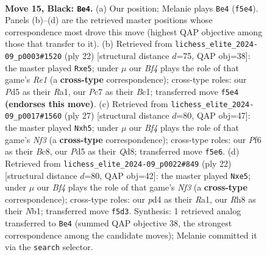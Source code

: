 \documentclass[11pt]{article}
\begin{document}
\clearpage

\begin{figure}[p]\centering
\begin{subfigure}{0.46\textwidth}\centering
\resizebox{\linewidth}{!}{%
\newchessgame
\chessboard[
  setfen={r2qk2r/ppp1b3/nn3pp1/1N1p1b1p/P2P4/1B5N/RPP2PPP/2BQR1K1 b kq - 7 15},
  showmover=false,
  pgfstyle=straightmove, color=movearrow, markmove={f5-e4}
]}
\caption{}
\end{subfigure}\hfill
\begin{subfigure}{0.46\textwidth}\centering
\resizebox{\linewidth}{!}{%
\newchessgame
\chessboard[
  setfen={r1bq1rk1/4ppbp/pp3np1/2p1n3/P1B5/2NP3P/1PP2PP1/R1BQR1K1 w - - 0 12},
  showmover=false,
  pgfstyle=straightmove, color=movearrow, markmove={e1-e5}
]}
\caption{}
\end{subfigure}
\\[4pt]
\begin{subfigure}{0.46\textwidth}\centering
\resizebox{\linewidth}{!}{%
\newchessgame
\chessboard[
  setfen={r1bqr1k1/1p2bppp/2pp1n2/p6N/Pn2P3/1BN4P/1PP2PP1/R1BQ1RK1 b - - 2 14},
  showmover=false,
  pgfstyle=straightmove, color=movearrow, markmove={f6-h5}
]}
\caption{}
\end{subfigure}\hfill
\begin{subfigure}{0.46\textwidth}\centering
\resizebox{\linewidth}{!}{%
\newchessgame
\chessboard[
  setfen={r1bqr1k1/2p2ppp/pb1p1n2/1p2n3/4P3/1BP2N1P/PP3PP1/RNBQR1K1 w - - 0 12},
  showmover=false,
  pgfstyle=straightmove, color=movearrow, markmove={f3-e5}
]}
\caption{}
\end{subfigure}
\caption{\textbf{Move 15, Black: \texttt{Be4}.} (a) Our position; Melanie plays \texttt{Be4} (\texttt{f5e4}). Panels (b)--(d) are the retrieved master positions whose correspondence most drove this move (highest QAP objective among those that transfer to it). (b) Retrieved from \texttt{lichess\_elite\_2024-09\_p0003\#1520} (ply 22) [structural distance $d$=75, QAP obj=38]: the master played \texttt{Rxe5}; under $\mu$ our \emph{Bf4} plays the role of that game's \emph{Re1} (a \textbf{cross-type} correspondence); cross-type roles: our \emph{P}d5 as their \emph{R}a1, our \emph{P}c7 as their \emph{B}c1; transferred move \texttt{f5e4} \textbf{(endorses this move)}. (c) Retrieved from \texttt{lichess\_elite\_2024-09\_p0017\#1560} (ply 27) [structural distance $d$=80, QAP obj=47]: the master played \texttt{Nxh5}; under $\mu$ our \emph{Bf4} plays the role of that game's \emph{Nf3} (a \textbf{cross-type} correspondence); cross-type roles: our \emph{P}f6 as their \emph{B}c8, our \emph{P}d5 as their \emph{Q}d8; transferred move \texttt{f5e6}. (d) Retrieved from \texttt{lichess\_elite\_2024-09\_p0022\#849} (ply 22) [structural distance $d$=80, QAP obj=42]: the master played \texttt{Nxe5}; under $\mu$ our \emph{Bf4} plays the role of that game's \emph{Nf3} (a \textbf{cross-type} correspondence); cross-type roles: our \emph{p}d4 as their \emph{R}a1, our \emph{R}h8 as their \emph{N}b1; transferred move \texttt{f5d3}. Synthesis: 1 retrieved analog transferred to \texttt{Be4} (summed QAP objective 38, the strongest correspondence among the candidate moves); Melanie committed it via the \texttt{search} selector.}
\label{fig:thought-m29}
\end{figure}
\end{document}

